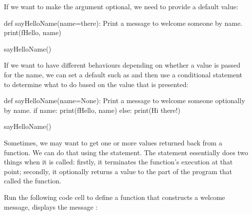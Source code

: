 \documentclass[letterpaper,10pt,english]{sphinxmanual}
\begin{document}
{If we want to make the argument optional, we need to provide a default value:

{
\begin{sphinxVerbatim}[commandchars=\\\{\}]
\llap{\color{nbsphinxin}[ ]:\,\hspace{\fboxrule}\hspace{\fboxsep}}def sayHelloName(name=\PYGZsq{}there\PYGZsq{}):
    \PYGZdq{}\PYGZdq{}\PYGZdq{}Print a message to welcome someone by name.\PYGZdq{}\PYGZdq{}\PYGZdq{}
    print(f\PYGZdq{}Hello, \PYGZob{}name\PYGZcb{}\PYGZdq{})

sayHelloName()
\end{sphinxVerbatim}
}

If we want to have different behaviours depending on whether a value is passed for the name, we can set a default such as  and then use a conditional statement to determine what to do based on the value that is presented:

{
\begin{sphinxVerbatim}[commandchars=\\\{\}]
\llap{\color{nbsphinxin}[ ]:\,\hspace{\fboxrule}\hspace{\fboxsep}}def sayHelloName(name=None):
    \PYGZdq{}\PYGZdq{}\PYGZdq{}Print a message to welcome someone optionally by name.\PYGZdq{}\PYGZdq{}\PYGZdq{}
    if name:
        print(f\PYGZdq{}Hello, \PYGZob{}name\PYGZcb{}\PYGZdq{})
    else:
        print(\PYGZdq{}Hi there!\PYGZdq{})

sayHelloName()
\end{sphinxVerbatim}
}

Sometimes, we may want to get one or more values returned back from a function. We can do that using the  statement. The  statement essentially does two things when it is called: firstly, it terminates the function’s execution at that point; secondly, it optionally returns a value to the part of the program that called the function.

Run the following code cell to define a function that constructs a welcome message, displays the message :

}
\end{document}
